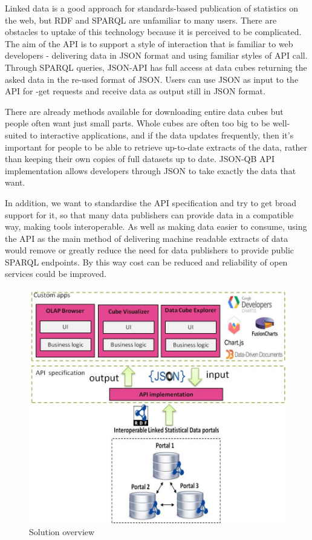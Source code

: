 \documentclass{llncs}
\begin{document}
Linked data is a good approach for standards-based publication of statistics on the web, but RDF and SPARQL are unfamiliar to many users. There are obstacles to uptake of this technology because it is perceived to be complicated. The aim of the API is to support a style of interaction that is familiar to web developers - delivering data in JSON format and using familiar styles of API call. Through SPARQL queries, JSON-API has full access at data cubes returning the asked data in the re-used format of JSON. Users can use JSON as input to the API for -get requests and receive data as output still in JSON format.

There are already methods available for downloading entire data cubes but people often want just small parts.  Whole cubes are often too big to be well-suited to interactive applications, and if the data updates frequently, then it's important for people to be able to retrieve up-to-date extracts of the data, rather than keeping their own copies of full datasets up to date. JSON-QB API implementation allows developers through JSON to take exactly the data that want.
 
In addition, we want to standardise the API specification and try to get broad support for it, so that many data publishers can provide data in a compatible way, making tools interoperable. As well as making data easier to consume, using the API as the main method of delivering machine readable extracts of data would remove or greatly reduce the need for data publishers to provide public SPARQL endpoints. By this way cost can be reduced and reliability of open services could be improved.

\begin{figure}
  \includegraphics{images/overview.jpg}
\caption{Solution overview}
\label{fig:overview}
\end{figure}
\end{document}
